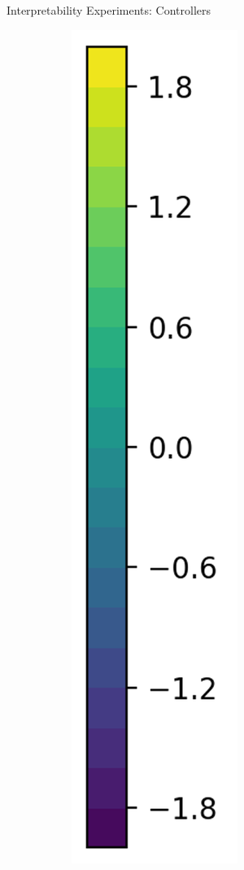 \documentclass{beamer}
\begin{document}
\begin{frame}{Interpretability Experiments: Controllers}
\begin{figure}[t]
\begin{subfigure}{0.05\linewidth}
      \includegraphics[width=\linewidth,trim=0 0 0 0,clip]{assets/ref_plots/controller_colorbar}

\end{subfigure}
\end{figure}
\end{frame}
\end{document}
